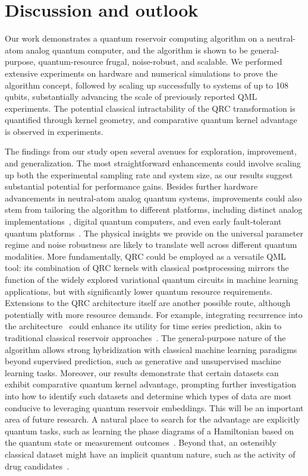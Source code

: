 \documentclass[english,floatfix,twocolumn,showpacs, aps, prx, reprint, superscriptaddress, longbibliography]{revtex4-2}
\begin{document}
\section*{Discussion and outlook}

Our work demonstrates a quantum reservoir computing algorithm on a neutral-atom analog quantum computer, and the algorithm is shown to be general-purpose, quantum-resource frugal, noise-robust, and scalable. We performed extensive experiments on hardware and numerical simulations to prove the algorithm concept, followed by scaling up successfully to systems of up to 108 qubits, substantially advancing the scale of previously reported QML experiments. The potential classical intractability of the QRC transformation is quantified through kernel geometry, and comparative quantum kernel advantage is observed in experiments.

The findings from our study open several avenues for exploration, improvement, and generalization. The most straightforward enhancements could involve scaling up both the experimental sampling rate and system size, as our results suggest substantial potential for performance gains. Besides further hardware advancements in neutral-atom analog quantum systems, improvements could also stem from tailoring the algorithm to different platforms, including distinct analog implementations~\cite{Shaw2024}, digital quantum computers, and even early fault-tolerant quantum platforms~\cite{ Bluvstein2023, Acharya2023, Mayer2024, Self2024}. The physical insights we provide on the universal parameter regime and noise robustness are likely to translate well across different quantum modalities. More fundamentally, QRC could be employed as a versatile QML tool: its combination of QRC kernels with classical postprocessing mirrors the function of the widely explored variational quantum circuits in machine learning applications, but with significantly lower quantum resource requirements. Extensions to the QRC architecture itself are another possible route, although potentially with more resource demands. For example, integrating recurrence into the architecture~\cite{Bravo2022} could enhance its utility for time series prediction, akin to traditional classical reservoir approaches~\cite{Jaeger2004}. The general-purpose nature of the algorithm allows strong hybridization with classical machine learning paradigms beyond supervised prediction, such as generative and unsupervised machine learning tasks. Moreover, our results demonstrate that certain datasets can exhibit comparative quantum kernel advantage, prompting further investigation into how to identify such datasets and determine which types of data are most conducive to leveraging quantum reservoir embeddings. This will be an important area of future research. A natural place to search for the advantage are explicitly quantum tasks, such as learning the phase diagrams of a Hamiltonian based on the quantum state or measurement outcomes~\cite{Huang2022}. Beyond that, an ostensibly classical dataset might have an implicit quantum nature, such as the activity of drug candidates~\cite{Vakili2024}.
\end{document}
